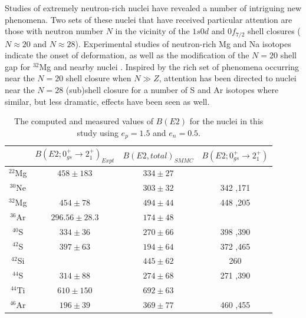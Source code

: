 \documentclass{article}
\begin{document}
Studies of extremely neutron-rich nuclei have revealed a number of
intriguing new phenomena.  Two sets of these nuclei that have received
particular attention are those with neutron number $N$ in the vicinity
of the $1s0d$ and $0f_{7/2}$ shell closures ($N \approx 20$ and $N
\approx 28$).  Experimental studies of neutron-rich Mg and Na isotopes
indicate the onset of deformation, as well as the modification of the
$N = 20$ shell gap for $^{32}$Mg and nearby nuclei \cite{r:motobayashi}.
Inspired by the rich set of phenomena occurring near the $N = 20$
shell closure when $N \gg Z$, attention has been directed to nuclei
near the $N = 28$ (sub)shell closure for a number of S and Ar isotopes
\cite{r:brown1,r:brown2} where similar, but less dramatic, effects
have been seen as well.
\begin{table}[hbtp]
\begin{center}
\caption{The computed and measured values of $B(E2)$ for
the nuclei in this study using $e_p=1.5$ and $e_n=0.5$.
}
\begin{tabular}{|cccc|}\hline
 & $B(E2; 0^+_{gs} \rightarrow 2^+_1)_{Expt}$ & $B(E2, total)_{SMMC}$ &
  $B(E2; 0^+_{gs} \rightarrow 2^+_1)$  \\\hline
 $^{22}$Mg & $458 \pm 183$ & $334 \pm 27 $
    & \\
 $^{30}$Ne & & $303 \pm 32$
    & 342 \cite{r:fukunishi},171 \cite{r:poves2}  \\
 $^{32}$Mg & $454 \pm 78$ \cite{r:motobayashi} & $494 \pm 44 $
   & 448 \cite{r:fukunishi},205 \cite{r:poves2} \\
 $^{36}$Ar & $296.56 \pm 28.3$ \cite{r:ensdf} & $174 \pm 48$
    & \\
 $^{40}$S & $334 \pm 36$ \cite{r:brown1} & $270 \pm 66$
    & 398 \cite{r:brown2},390 \cite{r:retamosa}  \\
 $^{42}$S & $397 \pm 63$ \cite{r:brown1} & $194 \pm 64$
   & 372 \cite{r:brown2},465 \cite{r:retamosa}  \\
 $^{42}$Si &  &  $445 \pm 62$
    & 260 \cite{r:retamosa}  \\
 $^{44}$S & $314 \pm 88$ \cite{r:brown2} & $274 \pm 68$
    & 271 \cite{r:brown2},390 \cite{r:retamosa}  \\
 $^{44}$Ti & $610 \pm 150$ \cite{r:raman} & $692 \pm 63$
    &  \\
 $^{46}$Ar & $196 \pm 39$ \cite{r:brown1} & $369 \pm 77 $
    & 460 \cite{r:brown1},455 \cite{r:retamosa}  \\\hline
\end{tabular}
\end{center}
\label{t:tab1}
\end{table}
\end{document}
